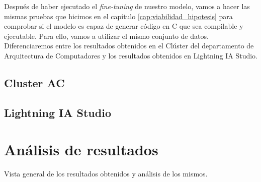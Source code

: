 
Después de haber ejecutado el \textit{fine-tuning} de nuestro modelo, vamos a hacer las mismas pruebas
que hicimos en el capítulo \ref{cap:viabilidad_hipotesis} para comprobar si el modelo es capaz de
generar código en C que sea compilable y ejecutable. Para ello, vamos a utilizar el mismo conjunto
de datos. Diferenciaremos entre los resultados obtenidos en el Clúster del departamento de Arquitectura
de Computadores y los resultados obtenidos en Lightning IA Studio.

\subsection{Cluster AC}
\label{subsec:cluster_ac}



\subsection{Lightning IA Studio}
\label{subsec:lightning_ia_studio}

\section{Análisis de resultados}
\label{sec:analisis_resultados}

Vista general de los resultados obtenidos y análisis de los mismos.
